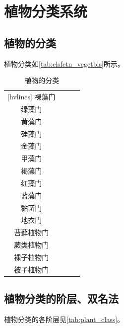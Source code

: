 \section{植物分类系统}

\subsection{植物的分类}

植物分类如\autoref{tab:clsfctn_vegetbls}所示。

\begin{table}[htbp]
	\centering
	\begin{NiceTabularX}{\textwidth}{cCCC}[hvlines]
		裸藻门 &  &  &  \\
		绿藻门 &  &  &  \\
		黄藻门 &  &  &  \\
		硅藻门 &  &  &  \\
		金藻门 &  &  &  \\
		甲藻门 &  &  &  \\
		褐藻门 &  &  &  \\
		红藻门 &  &  &  \\
		蓝藻门 &  &  &  \\
		黏菌门 &  &  &  \\
		地衣门 &  &  &  \\
		苔藓植物门 &  &  &  \\
		蕨类植物门 &  &  &  \\
		裸子植物门 &  &  &  \\
		被子植物门 &  &  & 
	\end{NiceTabularX}
	\caption{植物的分类}
	\label{tab:clsfctn_vegetbls}
\end{table}

\subsection{植物分类的阶层、双名法}

植物分类的各阶层见\autoref{tab:plant_class}。

